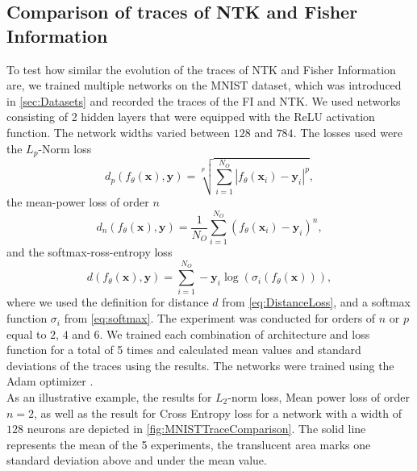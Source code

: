 \subsection{Comparison of traces of NTK and Fisher Information}\label{sec:TraceComparisonExperiment}
To test how similar the evolution of the traces of NTK and Fisher Information are, we trained multiple networks on the MNIST dataset, which was introduced in \cref{sec:Datasets} and recorded the traces of the FI and NTK. We used networks consisting of 2 hidden layers that were equipped with the ReLU activation function. The network widths varied between $128$ and $784$. The losses used were the $L_p$-Norm loss \cite{LpNormSource}
\begin{equation}
	d_p(f_\theta(\mathbf{x}),\mathbf{y}) = \sqrt[p]{\sum_{i=1}^{N_O} |f_\theta(\mathbf{x}_i) - \mathbf{y}_i|^p},
\end{equation}
the mean-power loss of order $n$
\begin{equation}
	d_n(f_\theta(\mathbf{x}),\mathbf{y}) = \frac{1}{N_O} \sum_{i=1}^{N_O} (f_\theta(\mathbf{x}_i)-\mathbf{y}_i)^n,
\end{equation}
and the softmax-ross-entropy loss \cite{LossExamplePaper}
\begin{equation}
	d(f_\theta(\mathbf{x}),\mathbf{y}) = \sum_{i=1}^{N_O} -\mathbf{y}_i \log(\sigma_i(f_\theta(\mathbf{x}))),
\end{equation}
where we used the definition for distance $d$ from \cref{eq:DistanceLoss}, and a softmax function $\sigma_i$ from \cref{eq:softmax}. The experiment was conducted for orders of $n$ or $p$ equal to $2$, $4$ and $6$. We trained each combination of architecture and loss function for a total of 5 times and calculated mean values and standard deviations of the traces using the results. The networks were trained using the Adam optimizer \cite{adamPaper}.\\
As an illustrative example, the results for $L_2$-norm loss, Mean power loss of order $n=2$, as well as the result for Cross Entropy loss for a network with a width of $128$ neurons are depicted in \cref{fig:MNISTTraceComparison}. The solid line represents the mean of the 5 experiments, the translucent area marks one standard deviation above and under the mean value.\\
